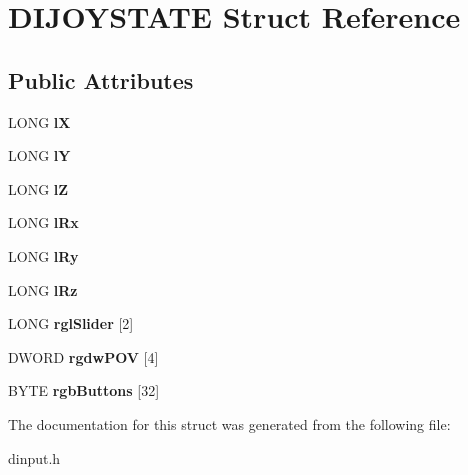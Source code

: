 \hypertarget{struct_d_i_j_o_y_s_t_a_t_e}{\section{D\-I\-J\-O\-Y\-S\-T\-A\-T\-E Struct Reference}
\label{struct_d_i_j_o_y_s_t_a_t_e}
}
\subsection*{Public Attributes}
\begin{DoxyCompactItemize}
\item 
\hypertarget{struct_d_i_j_o_y_s_t_a_t_e_abd924b6e2f5a609b5313edf5547cf0b9}{L\-O\-N\-G {\bfseries l\-X}}\label{struct_d_i_j_o_y_s_t_a_t_e_abd924b6e2f5a609b5313edf5547cf0b9}

\item 
\hypertarget{struct_d_i_j_o_y_s_t_a_t_e_ad604b49945189573c286a6bd182df906}{L\-O\-N\-G {\bfseries l\-Y}}\label{struct_d_i_j_o_y_s_t_a_t_e_ad604b49945189573c286a6bd182df906}

\item 
\hypertarget{struct_d_i_j_o_y_s_t_a_t_e_a8ea67d52b3e9d4ce1500a748c34aa773}{L\-O\-N\-G {\bfseries l\-Z}}\label{struct_d_i_j_o_y_s_t_a_t_e_a8ea67d52b3e9d4ce1500a748c34aa773}

\item 
\hypertarget{struct_d_i_j_o_y_s_t_a_t_e_a6232dc3ea7429cb73ff11df70276312d}{L\-O\-N\-G {\bfseries l\-Rx}}\label{struct_d_i_j_o_y_s_t_a_t_e_a6232dc3ea7429cb73ff11df70276312d}

\item 
\hypertarget{struct_d_i_j_o_y_s_t_a_t_e_a0ede2ea7033e37c69a7f1d73eec5967a}{L\-O\-N\-G {\bfseries l\-Ry}}\label{struct_d_i_j_o_y_s_t_a_t_e_a0ede2ea7033e37c69a7f1d73eec5967a}

\item 
\hypertarget{struct_d_i_j_o_y_s_t_a_t_e_a4baa12ccd83518de5ddca79a266e9bbc}{L\-O\-N\-G {\bfseries l\-Rz}}\label{struct_d_i_j_o_y_s_t_a_t_e_a4baa12ccd83518de5ddca79a266e9bbc}

\item 
\hypertarget{struct_d_i_j_o_y_s_t_a_t_e_ad26c1ad71dc41ff0898d61b0e1a42500}{L\-O\-N\-G {\bfseries rgl\-Slider} \mbox{[}2\mbox{]}}\label{struct_d_i_j_o_y_s_t_a_t_e_ad26c1ad71dc41ff0898d61b0e1a42500}

\item 
\hypertarget{struct_d_i_j_o_y_s_t_a_t_e_aca1b966c7e6143fca9483745b370051f}{D\-W\-O\-R\-D {\bfseries rgdw\-P\-O\-V} \mbox{[}4\mbox{]}}\label{struct_d_i_j_o_y_s_t_a_t_e_aca1b966c7e6143fca9483745b370051f}

\item 
\hypertarget{struct_d_i_j_o_y_s_t_a_t_e_ac9e24ad056dfbdce0b5c49558a8e7012}{B\-Y\-T\-E {\bfseries rgb\-Buttons} \mbox{[}32\mbox{]}}\label{struct_d_i_j_o_y_s_t_a_t_e_ac9e24ad056dfbdce0b5c49558a8e7012}

\end{DoxyCompactItemize}


The documentation for this struct was generated from the following file\-:\begin{DoxyCompactItemize}
\item 
dinput.\-h\end{DoxyCompactItemize}
